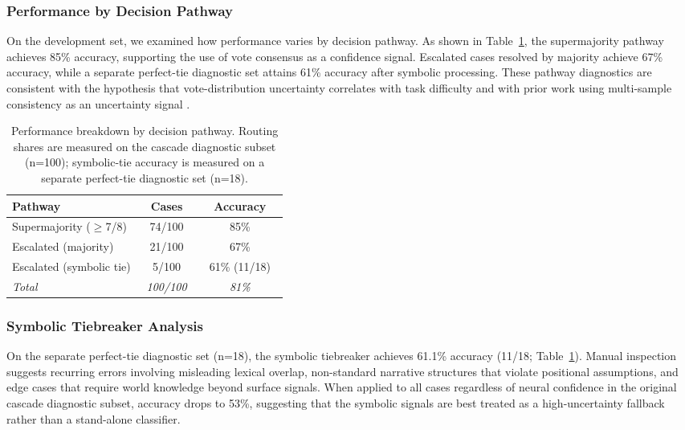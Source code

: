 \documentclass[11pt]{article}
\begin{document}
\subsubsection{Performance by Decision Pathway}
On the development set, we examined how performance varies by decision pathway. As shown in Table~\ref{tab:ablation}, the supermajority pathway achieves 85\% accuracy, supporting the use of vote consensus as a confidence signal. Escalated cases resolved by majority achieve 67\% accuracy, while a separate perfect-tie diagnostic set attains 61\% accuracy after symbolic processing. These pathway diagnostics are consistent with the hypothesis that vote-distribution uncertainty correlates with task difficulty and with prior work using multi-sample consistency as an uncertainty signal \citep{xiong2024uncertainty}.

\begin{table}[t]
\centering
\footnotesize
\begin{tabular}{@{}p{0.47\linewidth}cc@{}}
\toprule
\textbf{Pathway} & \textbf{Cases} & \textbf{Accuracy} \\
\midrule
Supermajority ($\geq$7/8) & 74/100 & 85\% \\
Escalated (majority) & 21/100 & 67\% \\
Escalated (symbolic tie) & 5/100 & 61\% (11/18) \\
\midrule
\textit{Total} & \textit{100/100} & \textit{81\%} \\
\bottomrule
\end{tabular}
\caption{Performance breakdown by decision pathway. Routing shares are measured on the cascade diagnostic subset (n=100); symbolic-tie accuracy is measured on a separate perfect-tie diagnostic set (n=18).}
\label{tab:ablation}
\end{table}



\subsubsection{Symbolic Tiebreaker Analysis}

On the separate perfect-tie diagnostic set (n=18), the symbolic tiebreaker achieves 61.1\% accuracy (11/18; Table~\ref{tab:ablation}). Manual inspection suggests recurring errors involving misleading lexical overlap, non-standard narrative structures that violate positional assumptions, and edge cases that require world knowledge beyond surface signals. When applied to all cases regardless of neural confidence in the original cascade diagnostic subset, accuracy drops to 53\%, suggesting that the symbolic signals are best treated as a high-uncertainty fallback rather than a stand-alone classifier.
\end{document}
